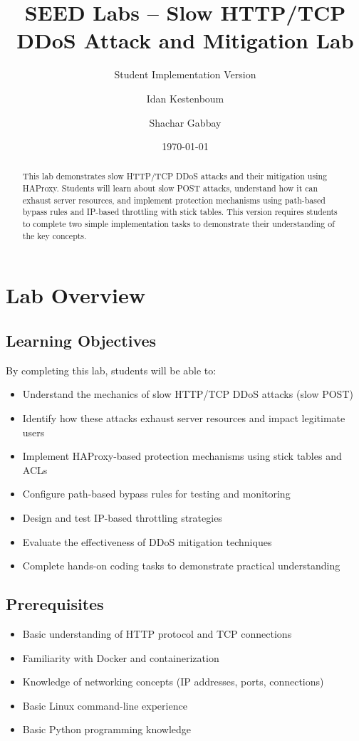 \documentclass[12pt]{article}
\title{SEED Labs – Slow HTTP/TCP DDoS Attack and Mitigation Lab}
\subtitle{Student Implementation Version}
\author{Idan Kestenboum \and Shachar Gabbay}
\date{\today}
\begin{document}
\maketitle

\begin{abstract}
This lab demonstrates slow HTTP/TCP DDoS attacks and their mitigation using HAProxy. Students will learn about slow POST attacks, understand how it can exhaust server resources, and implement protection mechanisms using path-based bypass rules and IP-based throttling with stick tables. This version requires students to complete two simple implementation tasks to demonstrate their understanding of the key concepts.
\end{abstract}

\tableofcontents
\newpage

\section{Lab Overview}

\subsection{Learning Objectives}
By completing this lab, students will be able to:
\begin{itemize}
    \item Understand the mechanics of slow HTTP/TCP DDoS attacks (slow POST)
    \item Identify how these attacks exhaust server resources and impact legitimate users
    \item Implement HAProxy-based protection mechanisms using stick tables and ACLs
    \item Configure path-based bypass rules for testing and monitoring
    \item Design and test IP-based throttling strategies
    \item Evaluate the effectiveness of DDoS mitigation techniques
    \item Complete hands-on coding tasks to demonstrate practical understanding
\end{itemize}

\subsection{Prerequisites}
\begin{itemize}
    \item Basic understanding of HTTP protocol and TCP connections
    \item Familiarity with Docker and containerization
    \item Knowledge of networking concepts (IP addresses, ports, connections)
    \item Basic Linux command-line experience
    \item Basic Python programming knowledge
\end{itemize}
\end{document}
